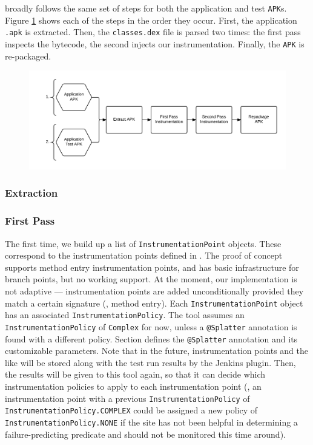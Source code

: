 \splatter broadly follows the same set of steps for both the application and test {\tt APK}s. Figure \ref{fig:instrumenting_apk} shows each of the steps in the order they occur. First, the application {\tt .apk} is extracted. Then, the {\tt classes.dex} file is parsed two times: the first pass inspects the bytecode, the second injects our instrumentation. Finally, the {\tt APK} is re-packaged.

\begin{figure}[h]
\includegraphics[width=\linewidth]{images/instrumenting_apk}
\caption{}
\label{fig:instrumenting_apk}
\end{figure}

\subsubsection{Extraction}



\subsubsection{First Pass}

The first time, we build up a list of {\tt InstrumentationPoint} objects. These correspond to the instrumentation points defined in . The proof of concept supports method entry instrumentation points, and has basic infrastructure for branch points, but no working support. At the moment, our implementation is not adaptive --- instrumentation points are added unconditionally provided they match a certain signature (\eg, method entry). Each {\tt InstrumentationPoint} object has an associated {\tt InstrumentationPolicy}. The tool assumes an {\tt InstrumentationPolicy} of {\tt Complex} for now, unless a {\tt @Splatter} annotation is found with a different policy. Section \todo{[]} defines the {\tt @Splatter} annotation and its customizable parameters. Note that in the future, instrumentation points and the like will be stored along with the test run results by the Jenkins plugin. Then, the results will be given to this tool again, so that it can decide which instrumentation policies to apply to each instrumentation point (\eg, an instrumentation point with a previous {\tt InstrumentationPolicy} of {\tt InstrumentationPolicy.COMPLEX} could be assigned a new policy of {\tt InstrumentationPolicy.NONE} if the site has not been helpful in determining a failure-predicting predicate and should not be monitored this time around).


